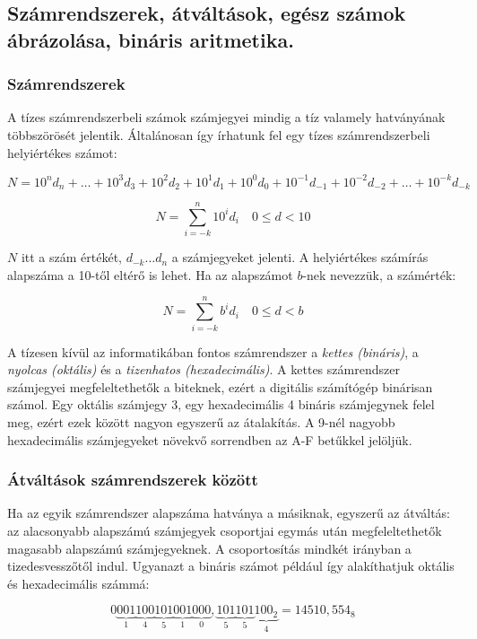 \documentclass[a4paper]{article}
\begin{document}
\subsection{Számrendszerek, átváltások, egész számok ábrázolása, bináris aritmetika.}

\subsubsection{Számrendszerek}

A tízes számrendszerbeli számok számjegyei mindig a tíz valamely hatványának többszörösét jelentik. Általánosan így írhatunk fel egy tízes számrendszerbeli helyiértékes számot:

$$N = 10^{n} d_n + \dots + 10^3 d_3 + 10^2 d_2 + 10^1 d_1 + 10^0 d_0 + 10^{-1} d_{-1} + 10^{-2} d_{-2} + \dots + 10^{-k} d_{-k}$$

$$N = \sum_{i=-k}^{n} 10^i d_i\quad0 \leq d < 10$$

$N$ itt a szám értékét, $d_{-k} \dots d_n$ a számjegyeket jelenti. A helyiértékes számírás alapszáma a 10-től eltérő is lehet. Ha az alapszámot $b$-nek nevezzük, a számérték:

$$N = \sum_{i=-k}^{n} b^i d_i\quad0 \leq d < b$$

A tízesen kívül az informatikában fontos számrendszer a \emph{kettes (bináris)}, a \emph{nyolcas (oktális)} és a \emph{tizenhatos (hexadecimális)}. A kettes számrendszer számjegyei megfeleltethetők a biteknek, ezért a digitális számítógép binárisan számol. Egy oktális számjegy 3, egy hexadecimális 4 bináris számjegynek felel meg, ezért ezek között nagyon egyszerű az átalakítás. A 9-nél nagyobb hexadecimális számjegyeket növekvő sorrendben az A-F betűkkel jelöljük.

\subsubsection{Átváltások számrendszerek között}

Ha az egyik számrendszer alapszáma hatványa a másiknak, egyszerű az átváltás: az alacsonyabb alapszámú számjegyek csoportjai egymás után megfeleltethetők magasabb alapszámú számjegyeknek. A csoportosítás mindkét irányban a tizedesvesszőtől indul. Ugyanazt a bináris számot például így alakíthatjuk oktális és hexadecimális számmá:

$$0\underbrace{0 0 1}_1 \underbrace{1 0 0}_4 \underbrace{1 0 1}_5 \underbrace{0 0 1}_1 \underbrace{0 0 0}_0 , \underbrace{1 0 1}_5 \underbrace{1 0 1}_5 \underbrace{1 0 0_2}_4 = 14510,554_8$$
\end{document}
